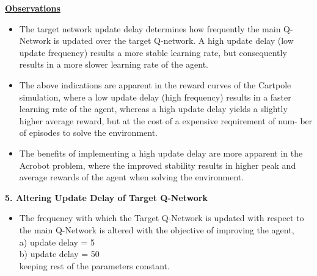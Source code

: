 \documentclass{article}
\begin{document}
\begin{itemize}
        \textbf{\underline{Observations}}
        \begin{itemize}
            \item The target network update delay determines how frequently the main Q-
            Network is updated over the target Q-network. A high update delay (low
            update frequency) results a more stable learning rate, but consequently
            results in a more slower learning rate of the agent.
            \item The above indications are apparent in the reward curves of the Cartpole
            simulation, where a low update delay (high frequency) results in a faster
            learning rate of the agent, whereas a high update delay yields a slightly
            higher average reward, but at the cost of a expensive requirement of num-
            ber of episodes to solve the environment.
            \item The benefits of implementing a high update delay are more apparent in
            the Acrobot problem, where the improved stability results in higher peak
            and average rewards of the agent when solving the environment.
        \end{itemize}

        \textbf{ 5. Altering Update Delay of Target Q-Network}\\
        \begin{itemize}
            \item The frequency with which the Target Q-Network is updated with respect
            to the main Q-Network is altered with the objective of improving the
            agent,\\
            a) update delay = 5 \\
            b) update delay = 50 \\keeping rest of the parameters constant. \\
        \end{itemize}



\end{itemize}
\end{document}
